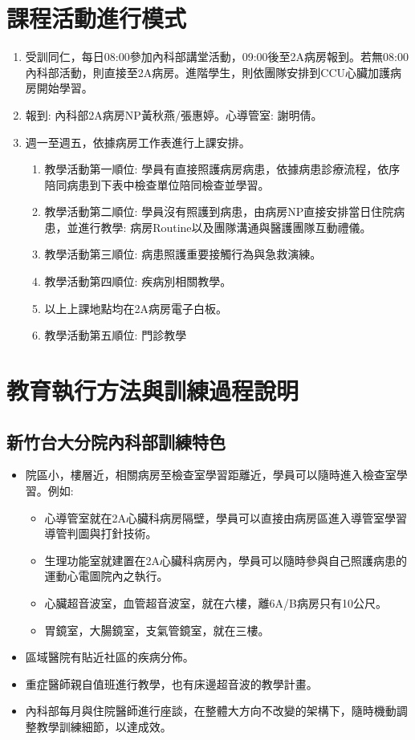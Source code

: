 \documentclass[12pt,a4paper]{article}
\begin{document}
\section{課程活動進行模式}
\begin{enumerate}
    \item 受訓同仁，每日08:00參加內科部講堂活動，09:00後至2A病房報到。若無08:00內科部活動，則直接至2A病房。進階學生，則依團隊安排到CCU心臟加護病房開始學習。
    \item 報到: 內科部2A病房NP黃秋燕/張惠婷。心導管室: 謝明倩。
    \item 週一至週五，依據病房工作表進行上課安排。
    \begin{enumerate}
        \item 教學活動第一順位: 學員有直接照護病房病患，依據病患診療流程，依序陪同病患到下表中檢查單位陪同檢查並學習。
        \item 教學活動第二順位: 學員沒有照護到病患，由病房NP直接安排當日住院病患，並進行教學: 病房Routine以及團隊溝通與醫護團隊互動禮儀。
        \item 教學活動第三順位: 病患照護重要接觸行為與急救演練。
        \item 教學活動第四順位: 疾病別相關教學。
        \item 以上上課地點均在2A病房電子白板。
        \item 教學活動第五順位: 門診教學
    \end{enumerate}
\end{enumerate}

\section{教育執行方法與訓練過程說明}
\subsection{新竹台大分院內科部訓練特色}
\begin{itemize}
    \item 院區小，樓層近，相關病房至檢查室學習距離近，學員可以隨時進入檢查室學習。例如:
    \begin{itemize}
        \item 心導管室就在2A心臟科病房隔壁，學員可以直接由病房區進入導管室學習導管判圖與打針技術。
        \item 生理功能室就建置在2A心臟科病房內，學員可以隨時參與自己照護病患的運動心電圖院內之執行。
        \item 心臟超音波室，血管超音波室，就在六樓，離6A/B病房只有10公尺。
        \item 胃鏡室，大腸鏡室，支氣管鏡室，就在三樓。
    \end{itemize}
    \item 區域醫院有貼近社區的疾病分佈。
    \item 重症醫師親自值班進行教學，也有床邊超音波的教學計畫。
    \item 內科部每月與住院醫師進行座談，在整體大方向不改變的架構下，隨時機動調整教學訓練細節，以達成效。
\end{itemize}
\end{document}
